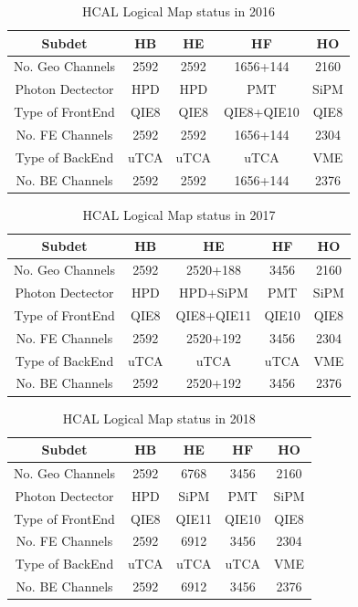 \begin{table}[htb]
\centering
\caption{
HCAL Logical Map status in 2016
}
\label{tab:2016lmaptaball}
\renewcommand{\arraystretch}{1.30}
 \begin{tabular}{ccccc}
  \hline
   Subdet & HB & HE & HF & HO \\
  \hline
   No. Geo Channels  & 2592 & 2592 & 1656+144   & 2160 \\
   Photon Dectector  & HPD  & HPD  & PMT        & SiPM \\
   Type of FrontEnd  & QIE8 & QIE8 & QIE8+QIE10 & QIE8 \\
   No. FE Channels   & 2592 & 2592 & 1656+144   & 2304 \\
   Type of BackEnd   & uTCA & uTCA & uTCA       & VME  \\
   No. BE Channels   & 2592 & 2592 & 1656+144   & 2376 \\
  \hline
 \end{tabular}
\end{table}

\begin{table}[htb]
\centering
\caption{
HCAL Logical Map status in 2017
}
\label{tab:2017lmaptaball}
\renewcommand{\arraystretch}{1.30}
 \begin{tabular}{ccccc}
  \hline
   Subdet & HB & HE & HF & HO \\
  \hline
   No. Geo Channels  & 2592 & 2520+188   & 3456  & 2160 \\
   Photon Dectector  & HPD  & HPD+SiPM   & PMT   & SiPM \\
   Type of FrontEnd  & QIE8 & QIE8+QIE11 & QIE10 & QIE8 \\
   No. FE Channels   & 2592 & 2520+192   & 3456  & 2304 \\
   Type of BackEnd   & uTCA & uTCA       & uTCA  & VME  \\
   No. BE Channels   & 2592 & 2520+192   & 3456  & 2376 \\
  \hline
 \end{tabular}
\end{table}

\begin{table}[htb]
\centering
\caption{
HCAL Logical Map status in 2018
}
\label{tab:2018lmaptaball}
\renewcommand{\arraystretch}{1.30}
 \begin{tabular}{ccccc}
  \hline
   Subdet & HB & HE & HF & HO \\
  \hline
   No. Geo Channels  & 2592 & 6768  & 3456  & 2160 \\
   Photon Dectector  & HPD  & SiPM  & PMT   & SiPM \\
   Type of FrontEnd  & QIE8 & QIE11 & QIE10 & QIE8 \\
   No. FE Channels   & 2592 & 6912  & 3456  & 2304 \\
   Type of BackEnd   & uTCA & uTCA  & uTCA  & VME  \\
   No. BE Channels   & 2592 & 6912  & 3456  & 2376 \\
  \hline
 \end{tabular}
\end{table}

